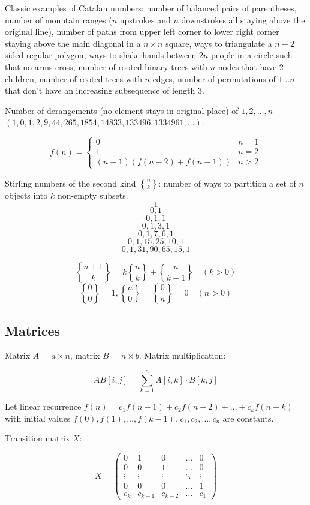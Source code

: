 \documentclass{article}
\DeclareRobustCommand{\stirling}{\genfrac\{\}{0pt}{}} %
\begin{document}
Classic examples of Catalan numbers: number of balanced pairs of parentheses,  number of mountain ranges ($n$ upstrokes and $n$ downstrokes all staying above the original line), number of paths from upper left corner to lower right corner staying above the main diagonal in a $n \times n$ square, ways to triangulate a $n+2$ sided regular polygon, ways to shake hands between $2n$ people in a circle such that no arms cross, number of rooted binary trees with $n$ nodes that have $2$ children, number of rooted trees with $n$ edges, number of permutations of $1 \dots n$ that don't have an increasing subsequence of length $3$.

Number of derangements (no element stays in original place) of $1, 2, \dots, n$ $(1, 0, 1, 2, 9, 44, 265, 1854, 14833, 133496, 1334961, \dots)$:

\[
	f(n) =
	\begin{cases}
		0 &n = 1 \\
		1 &n = 2 \\
		(n-1)(f(n-2)+f(n-1)) &n > 2
	\end{cases}
\]

Stirling numbers of the second kind $\stirling{n}{k}$: number of ways to partition a set of $n$ objects into $k$ non-empty subsets.
\[ 1 \] \[ 0, 1 \] \[0, 1, 1 \] \[0, 1, 3, 1 \] \[ 0, 1, 7, 6, 1 \] \[ 0, 1, 15, 25, 10, 1 \] \[ 0, 1, 31, 90, 65, 15, 1 \]

\[ \stirling{n+1}{k} = k\stirling{n}{k}+\stirling{n}{k-1} \quad (k > 0) \] 
\[ \stirling{0}{0} = 1, \stirling{n}{0} = \stirling{0}{n} = 0 \quad (n > 0) \]

\subsection {Matrices}

Matrix $A$ = $a \times n$, matrix $B$ = $n \times b$. Matrix multiplication:

\[ AB[i,j] = \sum_{k=1}^{n} A[i,k] \cdot B[k,j] \]

Let linear recurrence $f(n) = c_1f(n-1) + c_2f(n-2) + \dots + c_kf(n-k)$ with initial values $f(0), f(1), \dots, f(k-1)$. $c_1, c_2, \dots, c_n$ are constants.

Transition matrix $X$:

\[
	X =
	\begin{pmatrix}
		0 & 1 & 0 & \dots & 0 \\
		0 & 0 & 1 & \dots & 0 \\
		\vdots & \vdots & \vdots & \ddots & \vdots \\
		0 & 0 & 0 & \dots & 1 \\
		c_k & c_{k-1} & c_{k-2} & \dots & c_1
	\end{pmatrix}
\]
\end{document}
